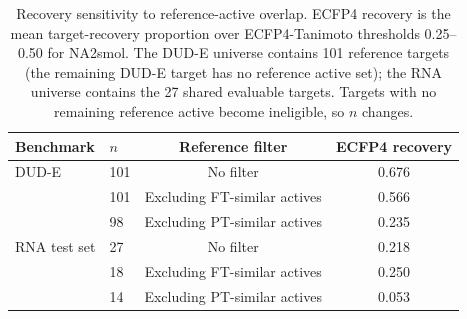 \begin{table}[!htbp]
\centering
\footnotesize
\setlength{\tabcolsep}{7pt}
\begin{tabular}{@{}llcc@{}}
\toprule
\textbf{Benchmark} & \textbf{$n$} & \textbf{Reference filter} & \textbf{ECFP4 recovery} \\
\midrule
DUD-E          & 101 & No filter                       & 0.676 \\
               & 101 & Excluding FT-similar actives    & 0.566 \\
               & 98  & Excluding PT-similar actives    & 0.235 \\
RNA test set   & 27  & No filter                       & 0.218 \\
               & 18  & Excluding FT-similar actives    & 0.250 \\
               & 14  & Excluding PT-similar actives    & 0.053 \\
\bottomrule
\end{tabular}

\caption{Recovery sensitivity to reference-active overlap. ECFP4 recovery is the mean target-recovery proportion over ECFP4-Tanimoto thresholds 0.25--0.50 for NA2smol. The DUD-E universe contains 101 reference targets (the remaining DUD-E target has no reference active set); the RNA universe contains the 27 shared evaluable targets. Targets with no remaining reference active become ineligible, so $n$ changes.}
\label{overlap_table}
\end{table}
